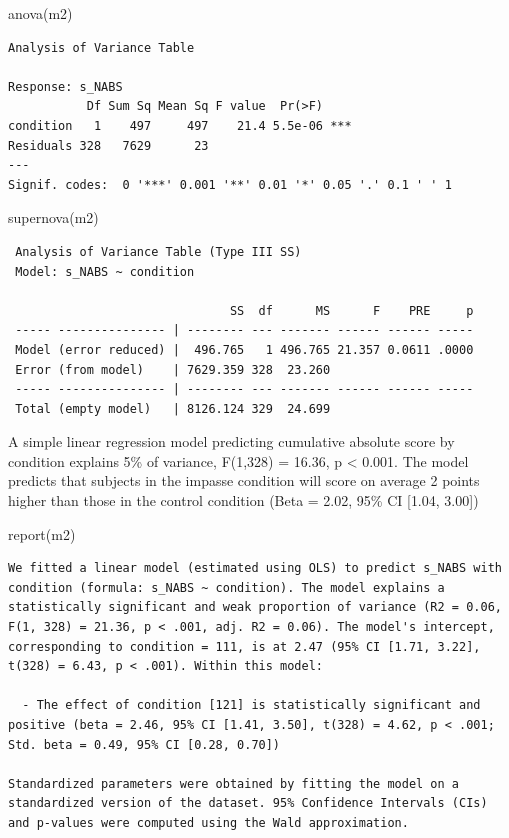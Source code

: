 \documentclass[
  letterpaper,
  DIV=11,
  numbers=noendperiod]{scrreprt}
\newenvironment{Shaded}{\begin{snugshade}}{\end{snugshade}}
\newcommand{\FunctionTok}[1]{\textcolor[rgb]{0.28,0.35,0.67}{#1}}
\newcommand{\NormalTok}[1]{\textcolor[rgb]{0.00,0.23,0.31}{#1}}
\begin{document}
\begin{Shaded}
\begin{Highlighting}[]
\FunctionTok{anova}\NormalTok{(m2)}
\end{Highlighting}
\end{Shaded}

\begin{verbatim}
Analysis of Variance Table

Response: s_NABS
           Df Sum Sq Mean Sq F value  Pr(>F)    
condition   1    497     497    21.4 5.5e-06 ***
Residuals 328   7629      23                    
---
Signif. codes:  0 '***' 0.001 '**' 0.01 '*' 0.05 '.' 0.1 ' ' 1
\end{verbatim}

\begin{Shaded}
\begin{Highlighting}[]
\FunctionTok{supernova}\NormalTok{(m2)}
\end{Highlighting}
\end{Shaded}

\begin{verbatim}
 Analysis of Variance Table (Type III SS)
 Model: s_NABS ~ condition

                               SS  df      MS      F    PRE     p
 ----- --------------- | -------- --- ------- ------ ------ -----
 Model (error reduced) |  496.765   1 496.765 21.357 0.0611 .0000
 Error (from model)    | 7629.359 328  23.260                    
 ----- --------------- | -------- --- ------- ------ ------ -----
 Total (empty model)   | 8126.124 329  24.699                    
\end{verbatim}

A simple linear regression model predicting cumulative absolute score by
condition explains 5\% of variance, F(1,328) = 16.36, p \textless{}
0.001. The model predicts that subjects in the impasse condition will
score on average 2 points higher than those in the control condition
(Beta = 2.02, 95\% CI {[}1.04, 3.00{]})

\begin{Shaded}
\begin{Highlighting}[]
\FunctionTok{report}\NormalTok{(m2)}
\end{Highlighting}
\end{Shaded}

\begin{verbatim}
We fitted a linear model (estimated using OLS) to predict s_NABS with condition (formula: s_NABS ~ condition). The model explains a statistically significant and weak proportion of variance (R2 = 0.06, F(1, 328) = 21.36, p < .001, adj. R2 = 0.06). The model's intercept, corresponding to condition = 111, is at 2.47 (95% CI [1.71, 3.22], t(328) = 6.43, p < .001). Within this model:

  - The effect of condition [121] is statistically significant and positive (beta = 2.46, 95% CI [1.41, 3.50], t(328) = 4.62, p < .001; Std. beta = 0.49, 95% CI [0.28, 0.70])

Standardized parameters were obtained by fitting the model on a standardized version of the dataset. 95% Confidence Intervals (CIs) and p-values were computed using the Wald approximation.
\end{verbatim}
\end{document}
